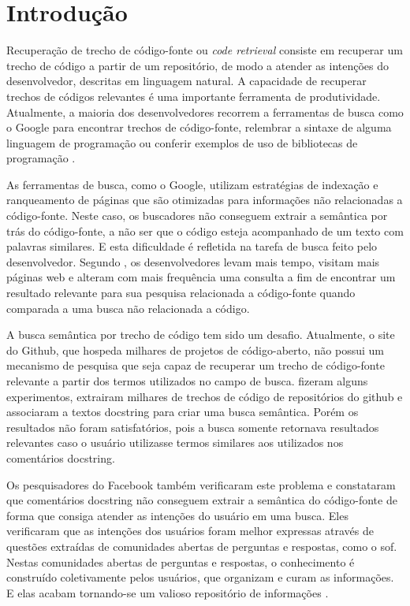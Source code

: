 \chapter{Introdução}
\label{cap:introducao}


Recuperação de trecho de código-fonte ou \textit{code retrieval} consiste em recuperar um trecho de código a partir de um repositório, de modo a atender as intenções do desenvolvedor, descritas em linguagem natural. A capacidade de recuperar trechos de códigos relevantes é uma importante ferramenta de produtividade. Atualmente, a maioria dos desenvolvedores recorrem a ferramentas de busca como o Google para encontrar trechos de código-fonte, relembrar a sintaxe de alguma linguagem de programação ou conferir exemplos de uso de bibliotecas de programação \citep{masudur-developers-use-google-code-retrieval:2018}.

As ferramentas de busca, como o Google, utilizam estratégias de indexação e ranqueamento de páginas que são otimizadas para informações não relacionadas a código-fonte. Neste caso, os buscadores não conseguem extrair a semântica por trás do código-fonte, a não ser que o código esteja acompanhado de um texto com palavras similares. E esta dificuldade é refletida na tarefa de busca feito pelo desenvolvedor. Segundo \cite{masudur-developers-use-google-code-retrieval:2018}, os desenvolvedores levam mais tempo, visitam mais páginas web e alteram com mais frequência uma consulta a fim de encontrar um resultado relevante para sua pesquisa relacionada a código-fonte quando comparada a uma busca não relacionada a código.


A busca semântica por trecho de código tem sido um desafio. Atualmente, o site do Github, que hospeda milhares de projetos de código-aberto, não possui um mecanismo de pesquisa que
seja capaz de recuperar um trecho de código-fonte relevante a partir dos termos utilizados no campo de busca. \cite{husain-github-semantic-search-code-2019} fizeram alguns experimentos, extrairam milhares de trechos de código de repositórios do \Gls{github} e associaram a textos \gls{docstring} para criar uma busca semântica. Porém os resultados não foram satisfatórios, pois a busca somente retornava resultados relevantes caso o usuário utilizasse termos similares aos utilizados nos comentários \gls{docstring}. 

Os pesquisadores do Facebook \citep{cambronero-deep-learning-code-search:2019} também verificaram este problema e constataram que comentários \gls{docstring} não conseguem extrair a semântica do código-fonte de forma que consiga atender as intenções do usuário em uma busca. Eles verificaram que as intenções dos usuários foram melhor expressas através de questões extraídas de comunidades abertas de perguntas e respostas, como o \gls{sof}. Nestas comunidades abertas de perguntas e respostas, o conhecimento é construído coletivamente pelos usuários, que organizam e curam as informações. E elas acabam tornando-se um valioso repositório de informações \citep{Wang-quora:2013}. 

